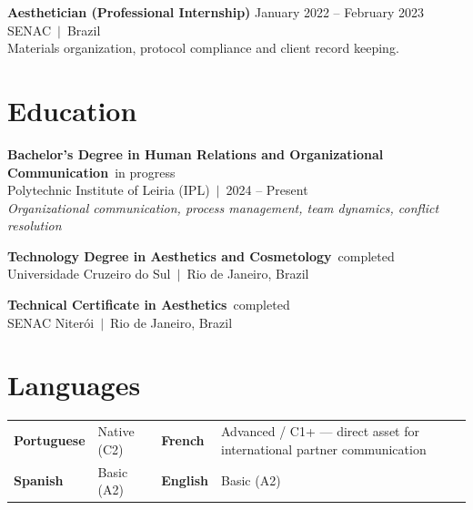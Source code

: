 \documentclass[10pt,a4paper]{article}
\begin{document}
\vspace{4pt}
{\small\bfseries Aesthetician (Professional Internship)}\hfill{\small\color{subtle} January 2022 -- February 2023}\\
{\small\color{accent} SENAC~$|$~Brazil}\\
{\small Materials organization, protocol compliance and client record keeping.}

\section{Education}

{\small\bfseries Bachelor's Degree in Human Relations and Organizational Communication}~\hfill{\small\color{subtle}in progress}\\
{\small Polytechnic Institute of Leiria (IPL)~$|$~2024 -- Present}\\
{\small\color{subtle}\textit{Organizational communication, process management, team dynamics, conflict resolution}}

\vspace{3pt}
{\small\bfseries Technology Degree in Aesthetics and Cosmetology}~\hfill{\small\color{subtle}completed}\\
{\small Universidade Cruzeiro do Sul~$|$~Rio de Janeiro, Brazil}

\vspace{3pt}
{\small\bfseries Technical Certificate in Aesthetics}~\hfill{\small\color{subtle}completed}\\
{\small SENAC Niterói~$|$~Rio de Janeiro, Brazil}

\section{Languages}

\begin{tabularx}{\textwidth}{llll}
  \small\textbf{Portuguese} & \small Native (C2) &
  \small\textbf{French} & \small Advanced / C1+ {\color{subtle}\small --- direct asset for international partner communication} \\[2pt]
  \small\textbf{Spanish} & \small Basic (A2) &
  \small\textbf{English} & \small Basic (A2) \\
\end{tabularx}
\end{document}
